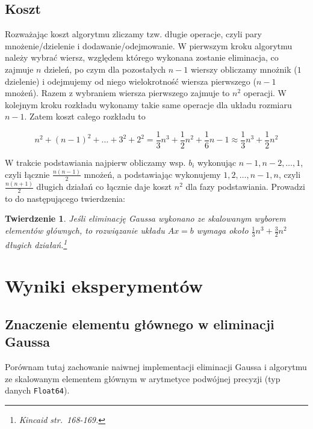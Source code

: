 \documentclass[11pt,wide]{mwart}
\newtheorem{tw}{Twierdzenie}
\begin{document}
\subsection{Koszt} \label{SS:gausscost}

Rozważając koszt algorytmu zliczamy tzw. długie operacje, czyli pary mnożenie/dzielenie i dodawanie/odejmowanie. W pierwszym kroku algorytmu należy wybrać wiersz, względem którego wykonana zostanie eliminacja, co zajmuje $ n $ dzieleń, po czym dla pozostałych $ n - 1 $ wierszy obliczamy mnożnik ($ 1 $ dzielenie) i odejmujemy od niego wielokrotność wiersza pierwszego ($ n-1 $ mnożeń). Razem z wybraniem wiersza pierwszego zajmuje to $ n^2 $ operacji. W kolejnym kroku rozkładu wykonamy takie same operacje dla układu rozmiaru $ n - 1 $. Zatem koszt całego rozkładu to

\begin{equation*}
	n^2 + (n-1)^2 + \ldots + 3^2 + 2^2 = \frac{1}{3}n^3 + \frac{1}{2}n^2 + \frac{1}{6}n - 1 \approx \frac{1}{3}n^3 + \frac{1}{2}n^2
\end{equation*}

\noindent W trakcie podstawiania najpierw obliczamy wsp. $ b_i $ wykonując $ n-1, n-2, \ldots, 1 $, czyli łącznie $ \frac{n(n-1)}{2} $ mnożeń, a podstawiając wykonujemy $ 1, 2, \ldots, n-1, n $, czyli $ \frac{n(n+1)}{2} $ długich działań co łącznie daje koszt $ n^2 $ dla fazy podstawiania. Prowadzi to do następującego twierdzenia:

\begin{tw} 
Jeśli eliminację Gaussa wykonano ze skalowanym wyborem elementów głównych, to rozwiązanie układu $ Ax = b $ wymaga około $ \frac{1}{3}n^3 + \frac{3}{2}n^2 $ długich działań.\footnote{\cite{kincaid} Kincaid str.~168-169.}
\end{tw} 

\section{Wyniki eksperymentów}

\subsection{Znaczenie elementu głównego w eliminacji Gaussa}

Porównam tutaj zachowanie naiwnej implementacji eliminacji Gaussa i algorytmu ze skalowanym elementem głównym w arytmetyce podwójnej precyzji (typ danych \texttt{Float64}).
\end{document}
